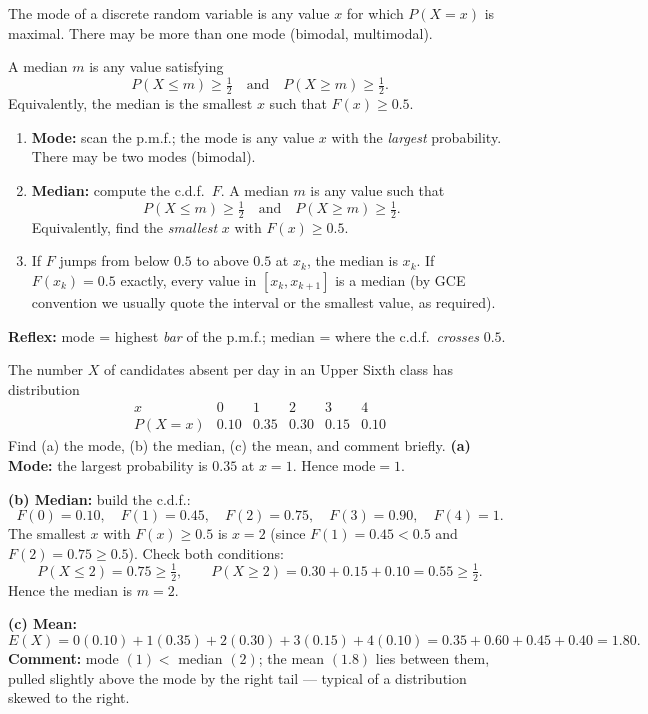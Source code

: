 \documentclass[11pt]{article}
\newcommand{\cle}[1]{{\popxbold\color{popdark}#1}}
\begin{document}
\begin{definition}
The \cle{mode} of a discrete random variable is any value $x$ for which $P(X=x)$ is maximal. There may be more than one mode (bimodal, multimodal).

A \cle{median} $m$ is any value satisfying
\[
P(X \le m) \ge \tfrac{1}{2} \quad \text{and} \quad P(X \ge m) \ge \tfrac{1}{2}.
\]
Equivalently, the median is the smallest $x$ such that $F(x) \ge 0.5$.
\end{definition}

\begin{methode}
\begin{enumerate}
\item \textbf{Mode:} scan the p.m.f.; the \cle{mode} is any value $x$ with the \emph{largest} probability. There may be two modes (bimodal).
\item \textbf{Median:} compute the c.d.f.\ $F$. A \cle{median} $m$ is any value such that
\[
P(X \leq m) \geq \tfrac{1}{2} \quad \text{and} \quad P(X \geq m) \geq \tfrac{1}{2}.
\]
Equivalently, find the \emph{smallest} $x$ with $F(x) \geq 0.5$.
\item If $F$ jumps from below $0.5$ to above $0.5$ at $x_k$, the median is $x_k$. If $F(x_k) = 0.5$ exactly, every value in $[x_k, x_{k+1}]$ is a median (by GCE convention we usually quote the interval or the smallest value, as required).
\end{enumerate}
\textbf{Reflex:} mode = highest \emph{bar} of the p.m.f.; median = where the c.d.f.\ \emph{crosses} $0.5$.
\end{methode}

\begin{exoresolu}
The number $X$ of candidates absent per day in an Upper Sixth class has distribution
\[
\begin{array}{c|ccccc}
x & 0 & 1 & 2 & 3 & 4 \\ \hline
P(X=x) & 0.10 & 0.35 & 0.30 & 0.15 & 0.10
\end{array}
\]
Find (a) the mode, (b) the median, (c) the mean, and comment briefly.
\tcblower
\textbf{(a) Mode:} the largest probability is $0.35$ at $x = 1$. Hence $\text{mode} = 1$.

\textbf{(b) Median:} build the c.d.f.:
\[
F(0) = 0.10, \quad F(1) = 0.45, \quad F(2) = 0.75, \quad F(3) = 0.90, \quad F(4) = 1.
\]
The smallest $x$ with $F(x) \geq 0.5$ is $x = 2$ (since $F(1) = 0.45 < 0.5$ and $F(2) = 0.75 \geq 0.5$). Check both conditions:
\[
P(X \leq 2) = 0.75 \geq \tfrac12, \qquad P(X \geq 2) = 0.30 + 0.15 + 0.10 = 0.55 \geq \tfrac12.
\]
Hence the median is $m = 2$.

\textbf{(c) Mean:}
\[
E(X) = 0(0.10) + 1(0.35) + 2(0.30) + 3(0.15) + 4(0.10) = 0.35 + 0.60 + 0.45 + 0.40 = 1.80.
\]
\textbf{Comment:} mode $(1) <$ median $(2)$; the mean $(1.8)$ lies between them, pulled slightly above the mode by the right tail — typical of a distribution skewed to the right.
\end{exoresolu}
\end{document}
